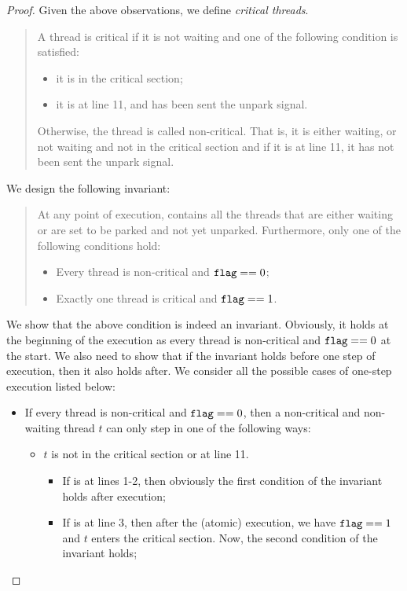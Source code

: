 \documentclass{article}[10pt]
\begin{document}
\begin{proof}
  Given the above observations, we define \emph{critical threads}. 
  \begin{quote}
    A thread is critical if it is not waiting and one of the following
    condition is satisfied:
    \begin{itemize}
    \item it is in the critical section;
    \item it is at line 11, and has been sent the unpark signal.
    \end{itemize}
    Otherwise, the thread is called non-critical. That is, it is
    either waiting, or not waiting and not in the critical section and
    if it is at line 11, it has not been sent the unpark signal.
  \end{quote}
  We design the following invariant:
  \begin{quote}
    At any point of execution, \kq contains all the threads that are
    either waiting or are set to be parked and not yet
    unparked. Furthermore, only one of the following conditions hold:
    \begin{itemize}
    \item Every thread is non-critical and $\text{\ttfamily flag} == 0$;
    \item Exactly one thread is critical and $\text{\ttfamily flag} == 1$.
    \end{itemize}
  \end{quote}
  We show that the above condition is indeed an
  invariant. Obviously, it holds at the beginning of the execution as
  every thread is non-critical and $\text{\ttfamily flag} == 0$ at the start. We also
  need to show that if the invariant holds before one step of
  execution, then it also holds after. We consider all the possible
  cases of one-step execution listed below:
  \begin{itemize}
  \item If every thread is non-critical and $\text{\ttfamily flag} == 0$, then a
    non-critical and non-waiting thread $t$ can only step in one of
    the following ways:
    \begin{itemize}
    \item $t$ is not in the critical section or at line 11. 

      \begin{itemize}
      \item If  is at lines 1-2, then obviously the first
        condition of the invariant holds after execution;

      \item If  is at line 3, then after the (atomic)
        execution, we have $\text{\ttfamily flag} == 1$ and $t$ enters the critical
        section. Now, the second condition of the invariant holds;


\end{itemize}
\end{itemize}
\end{itemize}
\end{proof}
\end{document}
